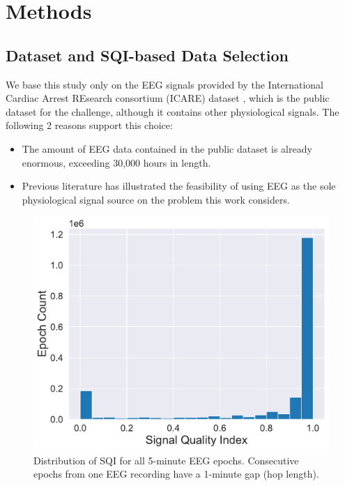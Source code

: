 \section{Methods}
\label{sec:methods}


\subsection{Dataset and SQI-based Data Selection}
\label{subsec:data-selection}

We base this study only on the EEG signals provided by the International Cardiac Arrest REsearch consortium (ICARE) dataset \cite{ICAREDatabase}, which is the public dataset for the challenge, although it contains other physiological signals. The following 2 reasons support this choice:
\begin{itemize}
    \item The amount of EEG data contained in the public dataset is already enormous, exceeding 30,000 hours in length.
    \item Previous literature \cite{Zheng_2021_coma} has illustrated the feasibility of using EEG as the sole physiological signal source on the problem this work considers.
\end{itemize}

\begin{figure}[!htp]
\centering
\includegraphics[width=\linewidth]{images/sqi-stats.pdf}
\caption[]{Distribution of SQI for all 5-minute EEG epochs. Consecutive epochs from one EEG recording have a 1-minute gap (hop length).}
\label{fig:sqi-stats}
\end{figure}

